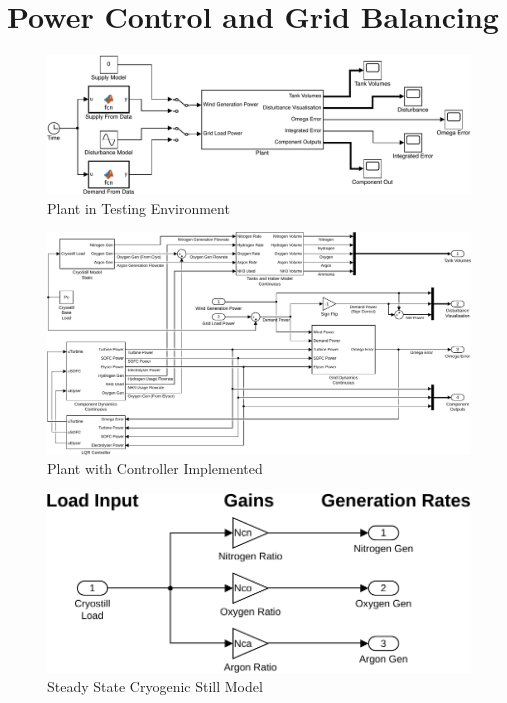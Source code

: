 \section{Power Control and Grid Balancing}




\begin{figure}[H]
\centering
        \includegraphics[scale=0.7]{images/plant/global.pdf}
        \caption{Plant in Testing Environment}
        \label{fig:global}
\end{figure}
\begin{figure}[H]
\centering
        \includegraphics[scale=0.6]{images/plant2/plant.pdf}
    \caption{Plant with Controller Implemented}
        \label{fig:plant}
\end{figure}
\begin{figure}[H]
\centering
        \includegraphics[scale=0.7]{images/plant2/cryo.pdf}
    \caption{Steady State Cryogenic Still Model}
        \label{fig:cryo}
\end{figure}
